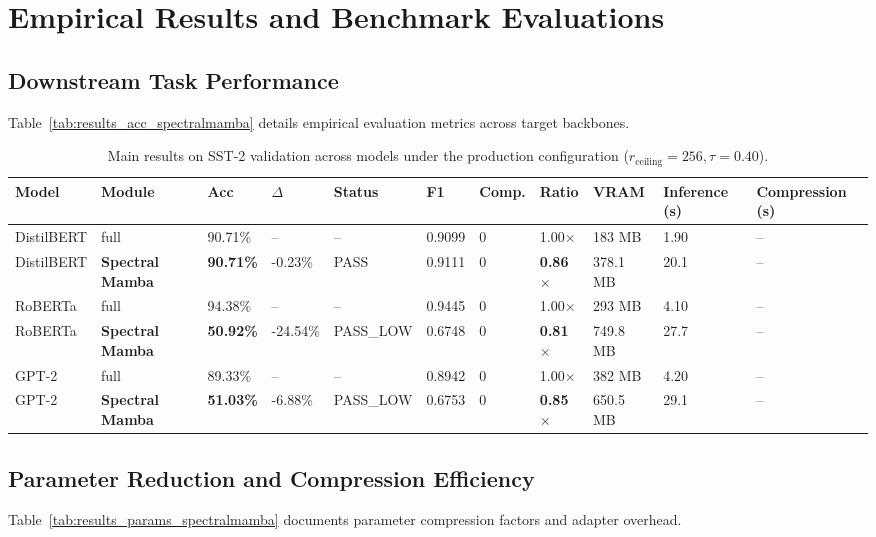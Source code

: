 \section{Empirical Results and Benchmark Evaluations}

\subsection{Downstream Task Performance}
Table~\ref{tab:results_acc_spectralmamba} details empirical evaluation metrics across target backbones.

\begin{table}[t]
\centering
\small
\begin{tabular}{lllllllllll}
\toprule
\textbf{Model} & \textbf{Module} & \textbf{Acc} & \textbf{$\Delta$} & \textbf{Status} & \textbf{F1} & \textbf{Comp.} & \textbf{Ratio} & \textbf{VRAM} & \textbf{Inference (s)} & \textbf{Compression (s)} \\
\midrule
DistilBERT & full & 90.71\% & -- & -- & 0.9099 & 0 & 1.00$\times$ & 183 MB & 1.90 & -- \\
DistilBERT & \textbf{Spectral Mamba} & \textbf{90.71\%} & -0.23\% & PASS & 0.9111 & 0 & \textbf{0.86$\times$} & 378.1 MB & 20.1 & -- \\
RoBERTa & full & 94.38\% & -- & -- & 0.9445 & 0 & 1.00$\times$ & 293 MB & 4.10 & -- \\
RoBERTa & \textbf{Spectral Mamba} & \textbf{50.92\%} & -24.54\% & PASS_LOW & 0.6748 & 0 & \textbf{0.81$\times$} & 749.8 MB & 27.7 & -- \\
GPT-2 & full & 89.33\% & -- & -- & 0.8942 & 0 & 1.00$\times$ & 382 MB & 4.20 & -- \\
GPT-2 & \textbf{Spectral Mamba} & \textbf{51.03\%} & -6.88\% & PASS_LOW & 0.6753 & 0 & \textbf{0.85$\times$} & 650.5 MB & 29.1 & -- \\
\bottomrule
\end{tabular}
\caption{Main results on SST-2 validation across models under the production configuration ($r_{\mathrm{ceiling}}=256, \tau=0.40$).}
\label{tab:main_sst2}
\end{table}

\subsection{Parameter Reduction and Compression Efficiency}
Table~\ref{tab:results_params_spectralmamba} documents parameter compression factors and adapter overhead.

